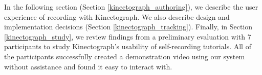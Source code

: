 In the following section (Section \ref{kinectograph_authoring}), we describe the user experience of recording with Kinectograph. We also describe design and implementation decisions (Section \ref{kinectograph_tracking}). Finally, in Section \ref{kinectograph_study}, we review findings from a preliminary evaluation with 7 participants to study Kinectograph's usability of self-recording tutorials. All of the participants successfully created a demonstration video using our system without assistance and found it easy to interact with.


